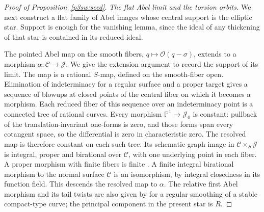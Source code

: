 \documentclass[11pt]{article}
\numberwithin{equation}{section}
\begin{document}
\begin{proof}[Proof of Proposition~\ref{p3sw:seed}]
\emph{The flat Abel limit and the torsion orbits.}
We next construct a flat family of Abel images whose central support is
the elliptic star.  Support is enough for the vanishing lemma, since the
ideal of any thickening of that star is contained in its reduced ideal.

The pointed Abel map on the smooth fibers,
\(q\mapsto\mathcal O(q-\sigma)\), extends to a morphism
\(\alpha:\mathcal C\to\mathcal J\).  We give the extension argument
to record the support of its limit.  The map is a rational
\(S\)-map, defined on the smooth-fiber open.  Elimination of
indeterminacy for a regular surface and a proper target
\cite[Lemma 54.4.3, Tag 0C5H]{P3SWStacks} gives a sequence of blowups
at closed points of the central fiber on which it becomes a
morphism.  Each reduced fiber of this sequence over an indeterminacy point
is a connected tree of rational curves.  Every morphism
\(\mathbb P^1\to\mathcal J_0\) is constant: pullback of the
translation-invariant one-forms is zero, and those forms span every
cotangent space, so the differential is zero in characteristic zero.
The resolved map is therefore constant on each such tree.
Its schematic graph image in
\(\mathcal C\times_S\mathcal J\) is integral, proper and birational
over \(\mathcal C\), with one underlying point in each fiber.
A proper morphism with finite fibers is finite
\cite[Lemma 37.44.1, Tag 02LS]{P3SWStacks}.  A finite integral
birational morphism to the normal surface \(\mathcal C\) is an
isomorphism, by integral closedness in its function field.  This
descends the resolved map to \(\alpha\).
The relative first Abel morphism and its tail twists are also given
by \cite[Section 2.2, (7), (9), and Proposition 2.4]{P3SWCoelhoPacini}
for a regular smoothing of a stable compact-type curve; the principal
component in the present star is \(R\).


\end{proof}
\end{document}
